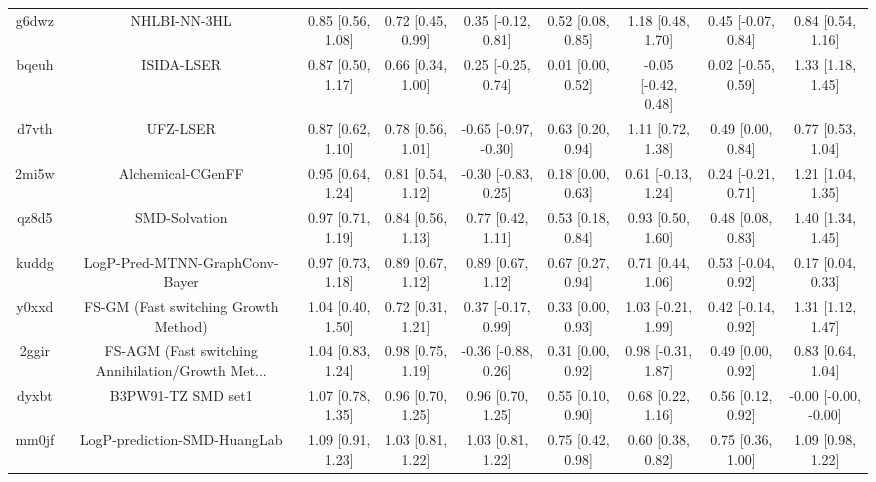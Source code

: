 \documentclass{article}
\begin{document}
\begin{center}
\begin{longtable}{|ccccccccc|}
 g6dwz &                                       NHLBI-NN-3HL &  0.85 [0.56, 1.08] &  0.72 [0.45, 0.99] &    0.35 [-0.12, 0.81] &  0.52 [0.08, 0.85] &    1.18 [0.48, 1.70] &   0.45 [-0.07, 0.84] &     0.84 [0.54, 1.16] \\
 bqeuh &                                         ISIDA-LSER &  0.87 [0.50, 1.17] &  0.66 [0.34, 1.00] &    0.25 [-0.25, 0.74] &  0.01 [0.00, 0.52] &  -0.05 [-0.42, 0.48] &   0.02 [-0.55, 0.59] &     1.33 [1.18, 1.45] \\
 d7vth &                                           UFZ-LSER &  0.87 [0.62, 1.10] &  0.78 [0.56, 1.01] &  -0.65 [-0.97, -0.30] &  0.63 [0.20, 0.94] &    1.11 [0.72, 1.38] &    0.49 [0.00, 0.84] &     0.77 [0.53, 1.04] \\
 2mi5w &                                  Alchemical-CGenFF &  0.95 [0.64, 1.24] &  0.81 [0.54, 1.12] &   -0.30 [-0.83, 0.25] &  0.18 [0.00, 0.63] &   0.61 [-0.13, 1.24] &   0.24 [-0.21, 0.71] &     1.21 [1.04, 1.35] \\
 qz8d5 &                                      SMD-Solvation &  0.97 [0.71, 1.19] &  0.84 [0.56, 1.13] &     0.77 [0.42, 1.11] &  0.53 [0.18, 0.84] &    0.93 [0.50, 1.60] &    0.48 [0.08, 0.83] &     1.40 [1.34, 1.45] \\
 kuddg &                     LogP-Pred-MTNN-GraphConv-Bayer &  0.97 [0.73, 1.18] &  0.89 [0.67, 1.12] &     0.89 [0.67, 1.12] &  0.67 [0.27, 0.94] &    0.71 [0.44, 1.06] &   0.53 [-0.04, 0.92] &     0.17 [0.04, 0.33] \\
 y0xxd &               FS-GM (Fast switching Growth Method) &  1.04 [0.40, 1.50] &  0.72 [0.31, 1.21] &    0.37 [-0.17, 0.99] &  0.33 [0.00, 0.93] &   1.03 [-0.21, 1.99] &   0.42 [-0.14, 0.92] &     1.31 [1.12, 1.47] \\
 2ggir &  FS-AGM (Fast switching Annihilation/Growth Met... &  1.04 [0.83, 1.24] &  0.98 [0.75, 1.19] &   -0.36 [-0.88, 0.26] &  0.31 [0.00, 0.92] &   0.98 [-0.31, 1.87] &    0.49 [0.00, 0.92] &     0.83 [0.64, 1.04] \\
 dyxbt &                                 B3PW91-TZ SMD set1 &  1.07 [0.78, 1.35] &  0.96 [0.70, 1.25] &     0.96 [0.70, 1.25] &  0.55 [0.10, 0.90] &    0.68 [0.22, 1.16] &    0.56 [0.12, 0.92] &  -0.00 [-0.00, -0.00] \\
 mm0jf &                       LogP-prediction-SMD-HuangLab &  1.09 [0.91, 1.23] &  1.03 [0.81, 1.22] &     1.03 [0.81, 1.22] &  0.75 [0.42, 0.98] &    0.60 [0.38, 0.82] &    0.75 [0.36, 1.00] &     1.09 [0.98, 1.22] \\

\end{longtable}
\end{center}
\end{document}
